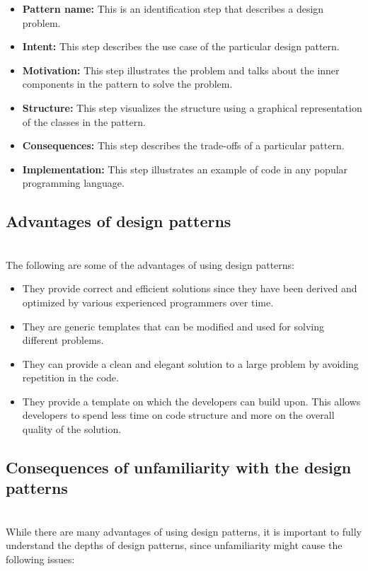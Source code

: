 \begin{itemize}
\item
\textbf{Pattern name:} This is an identification step that describes a design problem.
\item
\textbf{Intent:} This step describes the use case of the particular design pattern.
\item
\textbf{Motivation:} This step illustrates the problem and talks about the inner components in the pattern to solve the problem.
\item
\textbf{Structure:} This step visualizes the structure using a graphical representation of the classes in the pattern.
\item
\textbf{Consequences:} This step describes the trade-offs of a particular pattern.
\item
\textbf{Implementation:} This step illustrates an example of code in any popular programming language.
\end{itemize}

\subsection{Advantages of design patterns}\label{advantages-of-design-patterns}
\\
The following are some of the advantages of using design patterns:

\begin{itemize}
\item
They provide correct and efficient solutions since they have been derived and optimized by various experienced programmers over time.
\item
They are generic templates that can be modified and used for solving different problems.
\item
They can provide a clean and elegant solution to a large problem by avoiding repetition in the code.
\item
They provide a template on which the developers can build upon. This allows developers to spend less time on code structure and more on the overall quality of the solution.
\end{itemize}

\subsection{Consequences of unfamiliarity with the design patterns}\label{consequences-of-unfamiliarity-with-the-design-patterns}
\\
While there are many advantages of using design patterns, it is important to fully understand the depths of design patterns, since unfamiliarity might cause the following issues:

